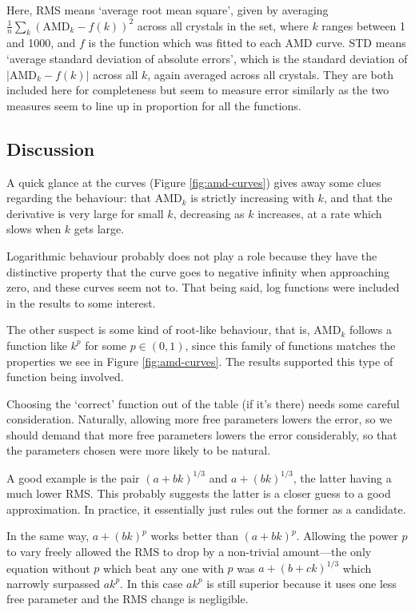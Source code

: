 \documentclass[11pt]{article}
\theoremstyle{definition}
\begin{document}
Here, RMS means `average root mean square', given by averaging $\frac{1}{n}\sum_k (\text{AMD}_k - f(k))^2$ across all crystals in the set, where $k$ ranges between 1 and 1000, and $f$ is the function which was fitted to each AMD curve. STD means `average standard deviation of absolute errors', which is the standard deviation of $|\text{AMD}_k - f(k)|$ across all $k$, again averaged across all crystals. They are both included here for completeness but seem to measure error similarly as the two measures seem to line up in proportion for all the functions.

\subsection{Discussion}\label{discussion}

A quick glance at the curves (Figure \ref{fig:amd-curves}) gives away some clues regarding the behaviour: that AMD$_k$ is strictly increasing with $k$, and that the derivative is very large for small $k$, decreasing as $k$ increases, at a rate which slows when $k$ gets large. 

Logarithmic behaviour probably does not play a role because they have the distinctive property that the curve goes to negative infinity when approaching zero, and these curves seem not to. That being said, log functions were included in the results to some interest. 

The other suspect is some kind of root-like behaviour, that is, AMD$_k$ follows a function like $k^p$ for some $p\in (0,1)$, since this family of functions matches the properties we see in Figure \ref{fig:amd-curves}. The results supported this type of function being involved. 

\null

Choosing the `correct' function out of the table (if it's there) needs some careful consideration. Naturally, allowing more free parameters lowers the error, so we should demand that more free parameters lowers the error considerably, so that the parameters chosen were more likely to be natural. 

A good example is the pair $(a+bk)^{1/3}$ and $a+(bk)^{1/3}$, the latter having a much lower RMS. This probably suggests the latter is a closer guess to a good approximation. In practice, it  essentially just rules out the former as a candidate.

In the same way, $a+(bk)^p$ works better than $(a+bk)^p$. Allowing the power $p$ to vary freely allowed the RMS to drop by a non-trivial amount---the only equation without $p$ which beat any one with $p$ was $a+(b+ck)^{1/3}$ which narrowly surpassed $ak^p$. In this case $ak^p$ is still superior because it uses one less free parameter and the RMS change is negligible. 
\end{document}
